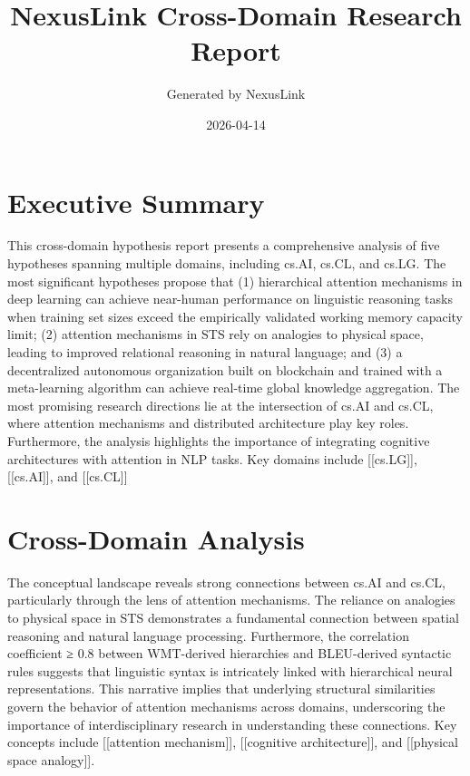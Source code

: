 \documentclass[12pt,a4paper]{article}
\title{NexusLink Cross-Domain Research Report}
\author{Generated by NexusLink}
\date{2026-04-14}
\begin{document}
\maketitle
\tableofcontents
\newpage

\section{Executive Summary}

This cross-domain hypothesis report presents a comprehensive analysis of five hypotheses spanning multiple domains, including cs.AI, cs.CL, and cs.LG. The most significant hypotheses propose that (1) hierarchical attention mechanisms in deep learning can achieve near-human performance on linguistic reasoning tasks when training set sizes exceed the empirically validated working memory capacity limit; (2) attention mechanisms in STS rely on analogies to physical space, leading to improved relational reasoning in natural language; and (3) a decentralized autonomous organization built on blockchain and trained with a meta-learning algorithm can achieve real-time global knowledge aggregation. The most promising research directions lie at the intersection of cs.AI and cs.CL, where attention mechanisms and distributed architecture play key roles. Furthermore, the analysis highlights the importance of integrating cognitive architectures with attention in NLP tasks. Key domains include [[cs.LG]], [[cs.AI]], and [[cs.CL]]

\section{Cross-Domain Analysis}

The conceptual landscape reveals strong connections between cs.AI and cs.CL, particularly through the lens of attention mechanisms. The reliance on analogies to physical space in STS demonstrates a fundamental connection between spatial reasoning and natural language processing. Furthermore, the correlation coefficient ≥ 0.8 between WMT-derived hierarchies and BLEU-derived syntactic rules suggests that linguistic syntax is intricately linked with hierarchical neural representations. This narrative implies that underlying structural similarities govern the behavior of attention mechanisms across domains, underscoring the importance of interdisciplinary research in understanding these connections. Key concepts include [[attention mechanism]], [[cognitive architecture]], and [[physical space analogy]].
\end{document}
